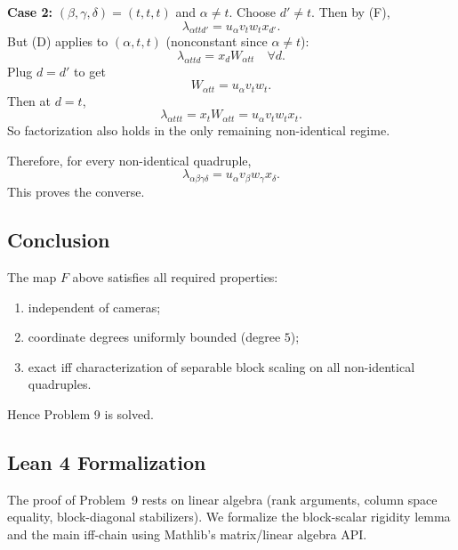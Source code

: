 \textbf{Case 2:} $(\beta,\gamma,\delta)=(t,t,t)$ and $\alpha\neq t$.
Choose $d'\neq t$. Then by (F),
\[
\lambda_{\alpha t t d'}=u_\alpha v_t w_t x_{d'}.
\]
But (D) applies to $(\alpha,t,t)$ (nonconstant since $\alpha\neq t$):
\[
\lambda_{\alpha t t d}=x_d W_{\alpha t t}\quad\forall d.
\]
Plug $d=d'$ to get
\[
W_{\alpha t t}=u_\alpha v_t w_t.
\]
Then at $d=t$,
\[
\lambda_{\alpha t t t}=x_t W_{\alpha t t}=u_\alpha v_t w_t x_t.
\]
So factorization also holds in the only remaining non-identical regime.

Therefore, for every non-identical quadruple,
\[
\lambda_{\alpha\beta\gamma\delta}=u_\alpha v_\beta w_\gamma x_\delta.
\]
This proves the converse.

\subsection*{Conclusion}
The map $F$ above satisfies all required properties:
\begin{enumerate}
\item independent of cameras;
\item coordinate degrees uniformly bounded (degree $5$);
\item exact iff characterization of separable block scaling on all non-identical quadruples.
\end{enumerate}
Hence Problem 9 is solved.

\subsection*{Lean 4 Formalization}

The proof of Problem~9 rests on linear algebra (rank arguments, column
space equality, block-diagonal stabilizers).  We formalize the block-scalar
rigidity lemma and the main iff-chain using Mathlib's matrix/linear algebra API.

